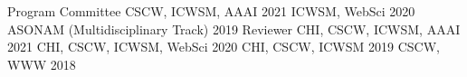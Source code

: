 \documentclass[letterpaper]{awesome-cv}
\begin{document}
\addvspace{2ex}
\begin{cventries}
  \cvaward
    {Program Committee}
    {CSCW, ICWSM, AAAI}
    {2021}
 \cvaward
    {}
    {ICWSM, WebSci}
    {2020}
 \cvaward
    {}
    {ASONAM (Multidisciplinary Track)}
    {2019}
  \cvaward
    {Reviewer}
    {CHI, CSCW, ICWSM, AAAI}
    {2021}
  \cvaward
    {}
    {CHI, CSCW, ICWSM, WebSci}
    {2020}
  \cvaward
    {}
    {CHI, CSCW, ICWSM}
    {2019}
  \cvaward
    {}
    {CSCW, WWW}
    {2018}
\end{cventries}
\end{document}
